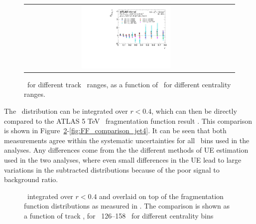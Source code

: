 \begin{figure}
{\begin{tabular}{cc}
	 \includegraphics[width=0.45\textwidth]{figures_results/RDpT_final_ratio_dR_CONF_data_jet7_cent5} \\
\end{tabular} }
   \caption{\RDptr\ for different track \pt\ ranges, as a function of \rvar\ for different centrality ranges.}
      \label{fig:rdptcent}
\end{figure}


The \Rdptr\ distribution can be integrated over $ r < 0.4 $, which can then be directly compared to the ATLAS 5 TeV \pbpb\ fragmentation function result \cite{ATLAS502FFConf}. This comparison is shown in Figure~\ref{fig:FF_comparison_jet1}-\ref{fig:FF_comparison_jet4}. It can be seen that both measurements agree within the systematic uncertainties for all \ptjet\ bins used in the analyses. Any differences come from the the different methods of UE estimation used in the two analyses, where even small differences in the UE lead to large variations in the subtracted distributions because of the poor signal to background ratio.

\begin{figure}
\caption{\Rdptr\ integrated over $ r < 0.4$ and overlaid on top of the fragmentation function distributions as measured in \cite{ATLAS502FFConf}. The comparison is shown as a function of track \pt, for \ptjet\ 126--158 \GeV\,  for different centrality bins }
\label{fig:FF_comparison_jet1}
\end{figure}

